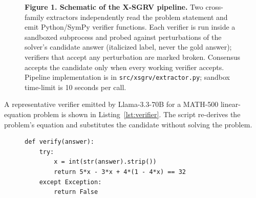 \documentclass[11pt]{article}
\begin{document}
\begin{figure}[h]
\centering
{}
\caption{\textbf{Figure 1. Schematic of the X-SGRV pipeline.} Two cross-family extractors independently read the problem statement and emit Python/SymPy verifier functions. Each verifier is run inside a sandboxed subprocess and probed against perturbations of the solver's candidate answer (italicized label, never the gold answer); verifiers that accept any perturbation are marked broken. Consensus accepts the candidate only when every working verifier accepts. Pipeline implementation is in \texttt{src/xsgrv/extractor.py}; sandbox time-limit is 10 seconds per call.}
\label{fig:pipeline}
\end{figure}

A representative verifier emitted by Llama-3.3-70B for a MATH-500 linear-equation problem is shown in Listing~\ref{lst:verifier}. The script re-derives the problem's equation and substitutes the candidate without solving the problem.

\begin{figure}[h]
\begin{lstlisting}[style=xsgrv,caption={\textbf{Listing 1. Representative X-SGRV verifier for a linear-equation MATH-500 problem.} The verifier re-derives the constraint from the problem statement and accepts the candidate only when the constraint is satisfied. The function is executed in a subprocess sandbox with a 10-second wall-clock limit.},label={lst:verifier}]
def verify(answer):
    try:
        x = int(str(answer).strip())
        return 5*x - 3*x + 4*(1 - 4*x) == 32
    except Exception:
        return False
\end{lstlisting}
\end{figure}
\end{document}
